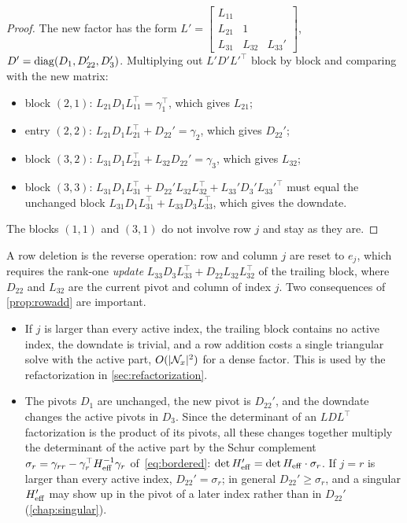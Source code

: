 \begin{proof}
The new factor has the form
$L' = \left[\begin{smallmatrix} L_{11} & & \\ L_{21} & 1 & \\ L_{31} & L_{32} & L_{33}'\end{smallmatrix}\right]$,
$D' = \operatorname{diag}(D_1, D_{22}', D_3')$. Multiplying out $L'D'L'^\top$ block by block and comparing with
the new matrix:
\begin{itemize}
    \item block $(2,1)$: $L_{21}D_1L_{11}^\top = \gamma_1^\top$, which gives $L_{21}$;
    \item entry $(2,2)$: $L_{21}D_1L_{21}^\top + D_{22}' = \gamma_2$, which gives $D_{22}'$;
    \item block $(3,2)$: $L_{31}D_1L_{21}^\top + L_{32}D_{22}' = \gamma_3$, which gives $L_{32}$;
    \item block $(3,3)$: $L_{31}D_1L_{31}^\top + D_{22}'L_{32}L_{32}^\top + L_{33}'D_3'L_{33}'^\top$ must
          equal the unchanged block $L_{31}D_1L_{31}^\top + L_{33}D_3L_{33}^\top$, which gives the
          downdate.
\end{itemize}
The blocks $(1,1)$ and $(3,1)$ do not involve row $j$ and stay as they are.
\end{proof}

A row deletion is the reverse operation: row and column $j$ are reset to $e_j$, which
requires the rank-one \emph{update} $L_{33}D_3L_{33}^\top + D_{22}L_{32}L_{32}^\top$ of the trailing
block, where $D_{22}$ and $L_{32}$ are the current pivot and column of index $j$. Two consequences of \cref{prop:rowadd} are important.

\begin{itemize}
    \item If $j$ is larger than every active index, the trailing block contains no active
          index, the downdate is trivial, and a row addition costs a single triangular solve
          with the active part, $O(|\mathcal{N}_x|^2)$ for a dense factor. This is used by the
          refactorization in \cref{sec:refactorization}.
    \item The pivots $D_1$ are unchanged, the new pivot is $D_{22}'$, and the downdate changes
          the active pivots in $D_3$. Since the determinant of an $LDL^\top$ factorization is the
          product of its pivots, all these changes together multiply the determinant of the
          active part by the Schur complement $\sigma_r = \gamma_{rr} - \gamma_r^\top H_{\mathrm{eff}}^{-1}\gamma_r$
          of~\eqref{eq:bordered}: $\det H_{\mathrm{eff}}' = \det H_{\mathrm{eff}}\cdot\sigma_r$. If $j = r$ is larger than
          every active index, $D_{22}' = \sigma_r$; in general $D_{22}'\ge\sigma_r$, and a singular
          $H_{\mathrm{eff}}'$ may show up in the pivot of a later index rather than in $D_{22}'$
          (\cref{chap:singular}).
\end{itemize}

